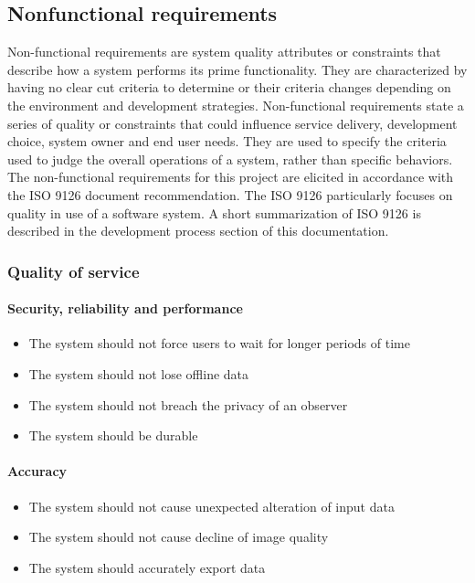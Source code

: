 \newpage
\subsection{Nonfunctional requirements} Non-functional requirements are system
quality attributes or constraints that describe how a system performs its prime
functionality.  They are characterized by having no clear cut criteria to
determine or their criteria changes depending on the environment and
development strategies\cite{req:requirements-technique2}.  Non-functional
requirements state a series of quality or constraints that could influence
service delivery, development choice, system owner and end user needs.  They
are used to specify the criteria used to judge the overall operations of a
system, rather than specific behaviors.  The non-functional requirements for
this project are elicited in accordance with the ISO 9126 document
recommendation.  The ISO 9126 particularly focuses on quality in use of a
software system.  A short summarization of ISO 9126 is described in the
development process section of this documentation.  \\[0.4cm]

\subsubsection{Quality of service}
    \paragraph{Security, reliability and performance}
	\begin{itemize}
		\item The system should not force users to wait for longer periods of time
        \item The system should not lose offline data
        \item The system should not breach the privacy of an observer
        \item The system should be durable
	\end{itemize}

    \paragraph{Accuracy}
        \begin{itemize}
            \item The system should not cause unexpected alteration of input data
            \item The system should not cause decline of image quality
            \item The system should accurately export data
        \end{itemize}

